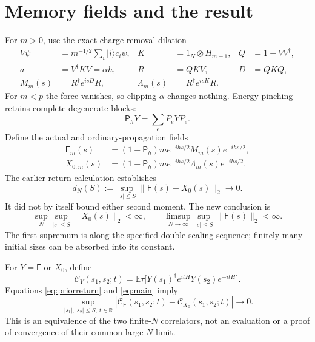 \documentclass[11pt,a4paper]{article}
\newcommand{\EE}{\mathbb E}
\newcommand{\PP}{\mathsf P_h}
\newcommand{\FF}{\mathsf F}
\begin{document}
\newpage
\section{Memory fields and the result}
For $m>0$, use the exact charge-removal dilation
\begin{align}
 V\psi&=m^{-1/2}\sum_i|i\rangle c_i\psi,&
 K&=1_N\otimes H_{m-1},&Q&=1-VV^\dagger,\\
 a&=V^\dagger KV=\alpha h,&R&=QKV,&D&=QKQ,\\
 M_m(s)&=R^\dagger e^{isD}R,&
 \Lambda_m(s)&=R^\dagger e^{isK}R.
\end{align}
For $m<p$ the force vanishes, so clipping $\alpha$ changes nothing.
Energy pinching retains complete degenerate blocks:
\begin{equation}
 \PP Y=\sum_eP_eYP_e.
\end{equation}
Define the actual and ordinary-propagation fields
\begin{align}
 \FF_m(s)&=(1-\PP)m e^{-ihs/2}M_m(s)e^{-ihs/2},\\
 X_{0,m}(s)&=(1-\PP)m e^{-ihs/2}\Lambda_m(s)e^{-ihs/2}.
\end{align}
The earlier return calculation \cite{Return} establishes
\begin{equation}
 d_N(S):=\sup_{|s|\le S}\|\FF(s)-X_0(s)\|_2\longrightarrow0.
 \label{eq:priorreturn}
\end{equation}
It did not by itself bound either second moment. The new conclusion is
\begin{equation}
 \boxed{\quad
 \sup_N\sup_{|s|\le S}\|X_0(s)\|_2<\infty,\qquad
 \limsup_{N\to\infty}\sup_{|s|\le S}\|\FF(s)\|_2<\infty.
 \quad}
 \label{eq:main}
\end{equation}
The first supremum is along the specified double-scaling sequence;
finitely many initial sizes can be absorbed into its constant.

For $Y=\FF$ or $X_0$, define
\begin{equation}
 \mathcal C_Y(s_1,s_2;t)
 =\EE\tau\big[Y(s_1)^\dagger e^{itH}Y(s_2)e^{-itH}\big].
\end{equation}
Equations \eqref{eq:priorreturn} and \eqref{eq:main} imply
\begin{equation}
 \sup_{|s_1|,|s_2|\le S,\ t\in\mathbb R}
 |\mathcal C_{\FF}(s_1,s_2;t)-\mathcal C_{X_0}(s_1,s_2;t)|\to0.
 \label{eq:cov}
\end{equation}
This is an equivalence of the two finite-$N$ correlators, not an
evaluation or a proof of convergence of their common large-$N$ limit.
\end{document}
